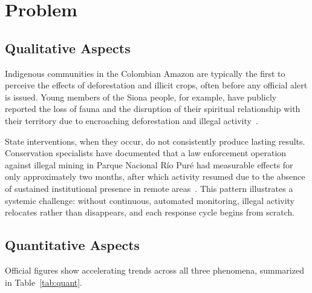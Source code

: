 \documentclass{article}
\begin{document}
\section{Problem}
\label{sec:problem}

\subsection{Qualitative Aspects}

Indigenous communities in the Colombian Amazon are typically the first to perceive
the effects of deforestation and illicit crops, often before any official alert
is issued.
Young members of the Siona people, for example, have publicly reported the loss
of fauna and the disruption of their spiritual relationship with their territory
due to encroaching deforestation and illegal activity~\cite{mongabay_siona2023}.

State interventions, when they occur, do not consistently produce lasting results.
Conservation specialists have documented that a law enforcement operation against
illegal mining in Parque Nacional Río Puré had measurable effects for only
approximately two months, after which activity resumed due to the absence of
sustained institutional presence in remote areas~\cite{mongabay_riopure2026}.
This pattern illustrates a systemic challenge: without continuous, automated
monitoring, illegal activity relocates rather than disappears, and each response
cycle begins from scratch.

\subsection{Quantitative Aspects}

Official figures show accelerating trends across all three phenomena, summarized
in Table~\ref{tab:quant}.
\end{document}
